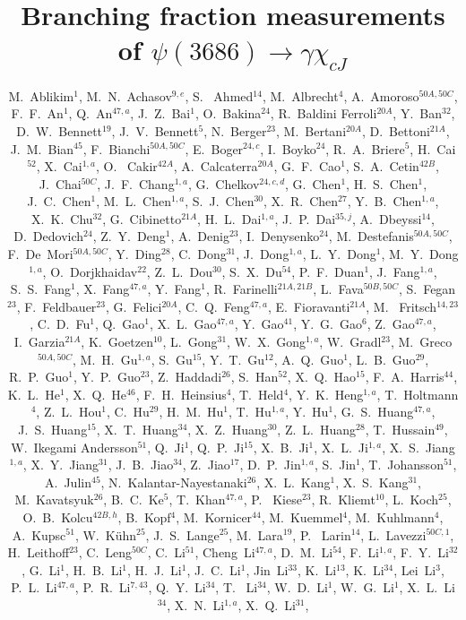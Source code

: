 \documentclass[aps,prd,twocolumn,showpacs,floatfix,byrevtex]{revtex4-1}
\begin{document}
 
\title{\boldmath Branching fraction measurements of $\psi(3686) \to
  \gamma \chi_{cJ}$}

\author{
\small
M.~Ablikim$^{1}$, M.~N.~Achasov$^{9,e}$, S. ~Ahmed$^{14}$, M.~Albrecht$^{4}$, A.~Amoroso$^{50A,50C}$, F.~F.~An$^{1}$, Q.~An$^{47,a}$, J.~Z.~Bai$^{1}$, O.~Bakina$^{24}$, R.~Baldini Ferroli$^{20A}$, Y.~Ban$^{32}$, D.~W.~Bennett$^{19}$, J.~V.~Bennett$^{5}$, N.~Berger$^{23}$, M.~Bertani$^{20A}$, D.~Bettoni$^{21A}$, J.~M.~Bian$^{45}$, F.~Bianchi$^{50A,50C}$, E.~Boger$^{24,c}$, I.~Boyko$^{24}$, R.~A.~Briere$^{5}$, H.~Cai$^{52}$, X.~Cai$^{1,a}$, O. ~Cakir$^{42A}$, A.~Calcaterra$^{20A}$, G.~F.~Cao$^{1}$, S.~A.~Cetin$^{42B}$, J.~Chai$^{50C}$, J.~F.~Chang$^{1,a}$, G.~Chelkov$^{24,c,d}$, G.~Chen$^{1}$, H.~S.~Chen$^{1}$, J.~C.~Chen$^{1}$, M.~L.~Chen$^{1,a}$, S.~J.~Chen$^{30}$, X.~R.~Chen$^{27}$, Y.~B.~Chen$^{1,a}$, X.~K.~Chu$^{32}$, G.~Cibinetto$^{21A}$, H.~L.~Dai$^{1,a}$, J.~P.~Dai$^{35,j}$, A.~Dbeyssi$^{14}$, D.~Dedovich$^{24}$, Z.~Y.~Deng$^{1}$, A.~Denig$^{23}$, I.~Denysenko$^{24}$, M.~Destefanis$^{50A,50C}$, F.~De~Mori$^{50A,50C}$, Y.~Ding$^{28}$, C.~Dong$^{31}$, J.~Dong$^{1,a}$, L.~Y.~Dong$^{1}$, M.~Y.~Dong$^{1,a}$, O.~Dorjkhaidav$^{22}$, Z.~L.~Dou$^{30}$, S.~X.~Du$^{54}$, P.~F.~Duan$^{1}$, J.~Fang$^{1,a}$, S.~S.~Fang$^{1}$, X.~Fang$^{47,a}$, Y.~Fang$^{1}$, R.~Farinelli$^{21A,21B}$, L.~Fava$^{50B,50C}$, S.~Fegan$^{23}$, F.~Feldbauer$^{23}$, G.~Felici$^{20A}$, C.~Q.~Feng$^{47,a}$, E.~Fioravanti$^{21A}$, M. ~Fritsch$^{14,23}$, C.~D.~Fu$^{1}$, Q.~Gao$^{1}$, X.~L.~Gao$^{47,a}$, Y.~Gao$^{41}$, Y.~G.~Gao$^{6}$, Z.~Gao$^{47,a}$, I.~Garzia$^{21A}$, K.~Goetzen$^{10}$, L.~Gong$^{31}$, W.~X.~Gong$^{1,a}$, W.~Gradl$^{23}$, M.~Greco$^{50A,50C}$, M.~H.~Gu$^{1,a}$, S.~Gu$^{15}$, Y.~T.~Gu$^{12}$, A.~Q.~Guo$^{1}$, L.~B.~Guo$^{29}$, R.~P.~Guo$^{1}$, Y.~P.~Guo$^{23}$, Z.~Haddadi$^{26}$, S.~Han$^{52}$, X.~Q.~Hao$^{15}$, F.~A.~Harris$^{44}$, K.~L.~He$^{1}$, X.~Q.~He$^{46}$, F.~H.~Heinsius$^{4}$, T.~Held$^{4}$, Y.~K.~Heng$^{1,a}$, T.~Holtmann$^{4}$, Z.~L.~Hou$^{1}$, C.~Hu$^{29}$, H.~M.~Hu$^{1}$, T.~Hu$^{1,a}$, Y.~Hu$^{1}$, G.~S.~Huang$^{47,a}$, J.~S.~Huang$^{15}$, X.~T.~Huang$^{34}$, X.~Z.~Huang$^{30}$, Z.~L.~Huang$^{28}$, T.~Hussain$^{49}$, W.~Ikegami Andersson$^{51}$, Q.~Ji$^{1}$, Q.~P.~Ji$^{15}$, X.~B.~Ji$^{1}$, X.~L.~Ji$^{1,a}$, X.~S.~Jiang$^{1,a}$, X.~Y.~Jiang$^{31}$, J.~B.~Jiao$^{34}$, Z.~Jiao$^{17}$, D.~P.~Jin$^{1,a}$, S.~Jin$^{1}$, T.~Johansson$^{51}$, A.~Julin$^{45}$, N.~Kalantar-Nayestanaki$^{26}$, X.~L.~Kang$^{1}$, X.~S.~Kang$^{31}$, M.~Kavatsyuk$^{26}$, B.~C.~Ke$^{5}$, T.~Khan$^{47,a}$, P. ~Kiese$^{23}$, R.~Kliemt$^{10}$, L.~Koch$^{25}$, O.~B.~Kolcu$^{42B,h}$, B.~Kopf$^{4}$, M.~Kornicer$^{44}$, M.~Kuemmel$^{4}$, M.~Kuhlmann$^{4}$, A.~Kupsc$^{51}$, W.~K\"uhn$^{25}$, J.~S.~Lange$^{25}$, M.~Lara$^{19}$, P. ~Larin$^{14}$, L.~Lavezzi$^{50C,1}$, H.~Leithoff$^{23}$, C.~Leng$^{50C}$, C.~Li$^{51}$, Cheng~Li$^{47,a}$, D.~M.~Li$^{54}$, F.~Li$^{1,a}$, F.~Y.~Li$^{32}$, G.~Li$^{1}$, H.~B.~Li$^{1}$, H.~J.~Li$^{1}$, J.~C.~Li$^{1}$, Jin~Li$^{33}$, K.~Li$^{13}$, K.~Li$^{34}$, Lei~Li$^{3}$, P.~L.~Li$^{47,a}$, P.~R.~Li$^{7,43}$, Q.~Y.~Li$^{34}$, T. ~Li$^{34}$, W.~D.~Li$^{1}$, W.~G.~Li$^{1}$, X.~L.~Li$^{34}$, X.~N.~Li$^{1,a}$, X.~Q.~Li$^{31}$, }
\end{document}
